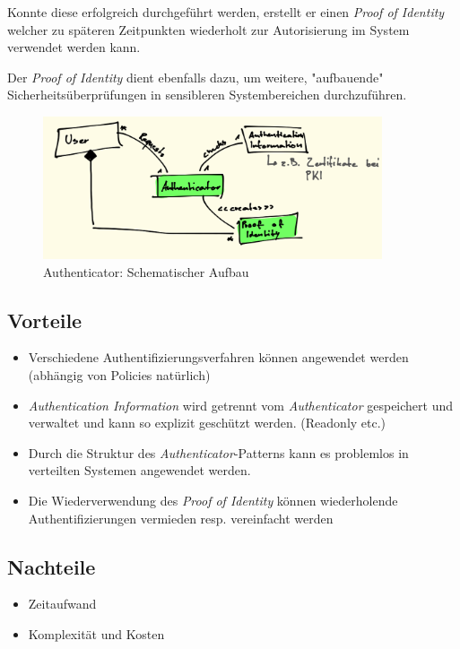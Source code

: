 Konnte diese erfolgreich durchgeführt werden, erstellt er einen \emph{Proof of Identity} welcher zu späteren Zeitpunkten wiederholt zur Autorisierung im System verwendet werden kann.

Der \emph{Proof of Identity} dient ebenfalls dazu, um weitere, "aufbauende" Sicherheitsüberprüfungen in sensibleren Systembereichen durchzuführen.

\begin{figure}[H]
	\includegraphics[width=10cm]{content/operating-system-access-control/images/authenticator.png}
	\caption{Authenticator: Schematischer Aufbau}
\end{figure}

\subsection*{Vorteile}
\begin{itemize}
	\item Verschiedene Authentifizierungsverfahren können angewendet werden (abhängig von Policies natürlich)
	\item \emph{Authentication Information} wird getrennt vom \emph{Authenticator} gespeichert und verwaltet und kann so explizit geschützt werden. (Readonly etc.)
	\item Durch die Struktur des \emph{Authenticator}-Patterns kann es problemlos in verteilten Systemen angewendet werden.
	\item Die Wiederverwendung des \emph{Proof of Identity} können wiederholende Authentifizierungen vermieden resp. vereinfacht werden
\end{itemize}

\subsection*{Nachteile}
\begin{itemize}
	\item Zeitaufwand
	\item Komplexität und Kosten
\end{itemize}

